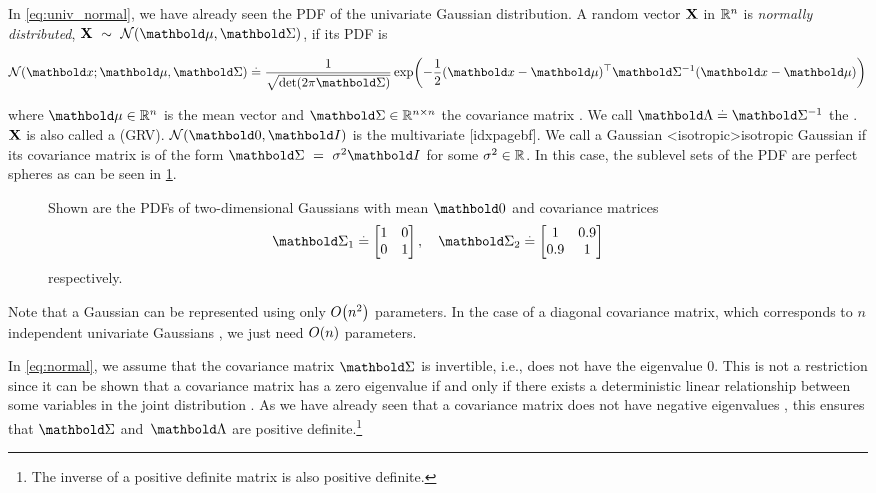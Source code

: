 In \cref{eq:univ_normal}, we have already seen the PDF of the univariate Gaussian distribution.
A random vector $\mathbf{X}$ in $\mathbb{R}^n$ is \emph{normally distributed}, $\rX~\sim~\N{\vmu}{\mSigma}$, if its PDF is \begin{thmb}\begin{align}\pidx{normal distribution}[idxpagebf]\pidx{Gaussian}[idxpagebf]
  \N[\vx]{\vmu}{\mSigma} \defeq \frac{1}{\sqrt{\det{2\pi\mSigma}}} \exp\parentheses*{-\frac{1}{2}\transpose{(\vx-\vmu)} \inv{\mSigma} (\vx-\vmu)} \label{eq:normal}
\end{align}\end{thmb} where $\vmu \in \R^n$ is the mean vector and $\mSigma \in \R^{n \times n}$ the covariance matrix .
We call $\mLambda \defeq \inv{\mSigma}$ the .
$\mathbf{X}$ is also called a  (GRV).
$\SN$ is the multivariate [idxpagebf].
We call a Gaussian \midx<isotropic>{isotropic Gaussian} if its covariance matrix is of the form $\mSigma~=~\sigma^2\mI$ for some $\sigma^2 \in \mathbb{R}$.
In this case, the sublevel sets of the PDF are perfect spheres as can be seen in \cref{fig:multivariate_normal}.

\begin{figure}
  \caption{Shown are the PDFs of two-dimensional Gaussians with mean $\vzero$ and covariance matrices \begin{equation*}
    \mSigma_1 \defeq \begin{bmatrix}
      1 & 0 \\
      0 & 1
    \end{bmatrix}, \quad \mSigma_2 \defeq \begin{bmatrix}
      1 & 0.9 \\
      0.9 & 1
    \end{bmatrix}
  \end{equation*} respectively.}\label{fig:multivariate_normal}
\end{figure}

Note that a Gaussian can be represented using only $\BigO{n^2}$ parameters.
In the case of a diagonal covariance matrix, which corresponds to $n$ independent univariate Gaussians , we just need $\BigO{n}$ parameters.

In \cref{eq:normal}, we assume that the covariance matrix $\mSigma$ is invertible, i.e., does not have the eigenvalue $0$.
This is not a restriction since it can be shown that a covariance matrix has a zero eigenvalue if and only if there exists a deterministic linear relationship between some variables in the joint distribution .
As we have already seen that a covariance matrix does not have negative eigenvalues , this ensures that $\mSigma$ and~$\mLambda$ are positive definite.\footnote{The inverse of a positive definite matrix is also positive definite.}

